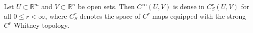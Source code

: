 Let $U \subset \mathbb{R}^m$ and $V \subset \mathbb{R}^n$ be open sets. Then $C^\infty(U, V)$ is dense in $C^r_S(U, V)$ for all $0 \leqslant r < \infty$, where $C^r_S$ denotes the space of $C^r$ maps equipped with the strong $C^r$ Whitney topology.
